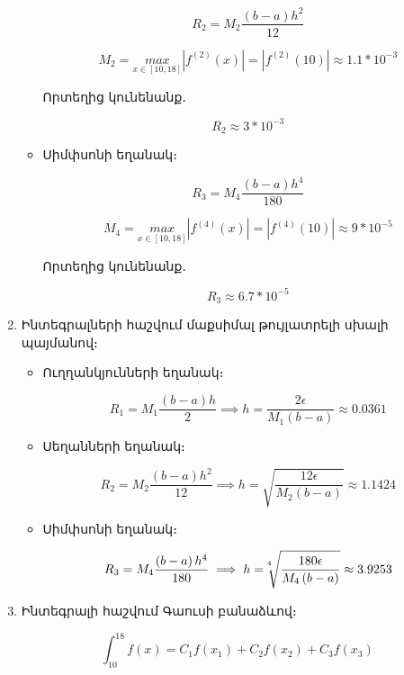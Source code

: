 \documentclass{article}
\begin{document}
\begin{enumerate}
\begin{itemize}
		$$R_2 = M_{2} \dfrac{\left(b - a\right)h^{2}}{12}$$

		$$M_{2} = \underset{x \in \left[10, 18\right]}{max}\left|f^{\left(2\right)}\left(x\right)\right| = \left|f^{\left(2\right)}\left(10\right)\right| \approx 1.1 * 10^{-3}$$

		Որտեղից կունենանք․

		$$R_2 \approx 3 * 10^{-3}$$

\item Սիմփսոնի եղանակ։
		
		$$R_3 = M_{4} \dfrac{\left(b - a\right)h^{4}}{180}$$

		$$M_{4} = \underset{x \in \left[10, 18\right]}{max}\left|f^{\left(4\right)}\left(x\right)\right| = \left|f^{\left(4\right)}\left(10\right)\right| \approx 9 * 10^{-5}$$

		Որտեղից կունենանք․

		$$R_3 \approx 6.7 * 10^{-5}$$



\end{itemize}

\item Ինտեգրալների հաշվում մաքսիմալ թույլատրելի սխալի պայմանով։

\begin{itemize}


\item Ուղղանկյունների եղանակ։

		$$R_1 = M_{1} \dfrac{\left(b - a\right)h}{2} \implies h = \dfrac{2 \epsilon}{M_1 \left(b - a\right)} \approx 0.0361 $$


\item Սեղանների եղանակ։

		$$R_2 = M_{2} \dfrac{\left(b - a\right)h^{2}}{12} \implies h = \sqrt{\dfrac{12 \epsilon}{M_{2}\left(b - a\right)}} \approx 1.1424$$

\item Սիմփսոնի եղանակ։

		$$R_3 = M_{4} \dfrac{\left(b - a\right)h^{4}}{180} \implies h = \sqrt[\leftroot{5} \uproot{5}4]{\dfrac{180 \epsilon}{M_{4}\left(b - a\right)}} \approx 3.9253$$


\end{itemize}

\item Ինտեգրալի հաշվում Գաուսի բանաձևով։

$$\int_{10}^{18} f \left(x\right) = C_{1}f\left(x_{1}\right)+C_{2}f\left(x_{2}\right)+C_{3}f\left(x_{3}\right)$$


\end{enumerate}
\end{document}
